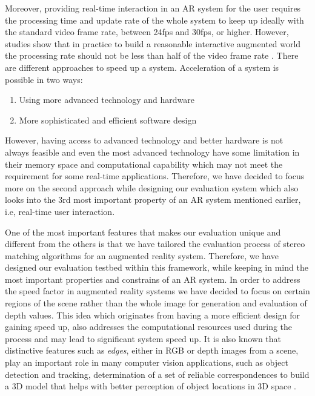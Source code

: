 Moreover, providing real-time interaction in an AR system for the user requires the processing time and update rate of the whole system to keep up ideally with the standard video frame rate, 
between 24fps and 
30fps, or higher. 
However, studies show that in practice to build a reasonable interactive augmented world the processing rate should not be less than half of the video frame rate \cite{hertz00}. 
There are different approaches to speed up a system. Acceleration of a system is possible in two ways:
\begin{enumerate}
\item Using more advanced technology and hardware
\item More sophisticated and efficient software design
\end{enumerate}
However, having access to advanced technology and better hardware is not always feasible and even the most advanced technology have some limitation in their memory space and computational capability
which may not meet the requirement for some real-time applications. 
Therefore, we have decided to focus more on the second approach while designing our evaluation system which also looks into the 3rd most important property of
an AR system mentioned earlier, i.e, real-time user interaction. \newline 

One of the most important features that makes our evaluation unique and different from the others is that we have tailored the evaluation process of stereo matching algorithms for an augmented 
reality system. Therefore, we have designed our evaluation testbed within this framework, while keeping in mind the most important properties and constrains of an AR system.
In order to address the speed factor in augmented reality systems we have decided to focus on certain regions of the scene rather than the whole image for generation and evaluation of 
depth values.  
This idea which originates from having a more efficient design for gaining speed up, 
also addresses the computational resources used during the process and may lead to significant system speed up.
It is also known that distinctive features such as {\it edges}, either in RGB or depth images from a scene, play an important role in many computer vision applications, such as object detection and 
tracking, determination of a set of reliable correspondences to build a 3D model that helps with better perception of object locations in 3D space \cite{mart01,sze11}.

